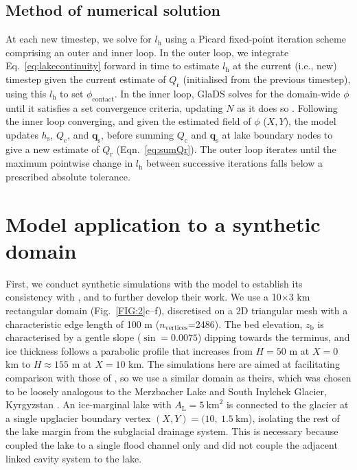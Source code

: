 \documentclass[tc, manuscript]{copernicus}
\begin{document}
\subsection{Method of numerical solution}\label{methods:Numeric}

At each new timestep, we solve for $l_{\mathrm{h}}$ using a Picard fixed-point iteration scheme comprising an outer and inner loop. In the outer loop, we integrate Eq.~\ref{eq:lakecontinuity} forward in time to estimate $l_{\mathrm{h}}$ at the current (i.e., new) timestep given the current estimate of $Q_{\mathrm{r}}$ (initialised from the previous timestep), using this $l_{\mathrm{h}}$ to set $\phi_{\mathrm{contact}}$. In the inner loop, GlaDS solves for the domain-wide $\phi$ until it satisfies a set convergence criteria, updating $N$ as it does so \citep{werder2013modeling,hill2024improved}. Following the inner loop converging, and given the estimated field of $\phi$ ($X,Y$), the model updates $h_{\mathrm{s}}$, $Q_{\mathrm{c}}$, and $\mathbf{q}_{\mathrm{s}}$, before summing $Q_{\mathrm{c}}$ and $\mathbf{q}_{\mathrm{s}}$ at lake boundary nodes to give a new estimate of $Q_{\mathrm{r}}$ (Eqn.~\ref{eq:sumQr}). The outer loop iterates until the maximum pointwise change in $l_{\mathrm{h}}$ between successive iterations falls below a prescribed absolute tolerance.


\section{Model application to a synthetic domain}\label{application:synth}

First, we conduct synthetic simulations with the model to establish its consistency with \citet{kingslake2013modelling}, and to further develop their work. We use a 10$\times$3 km rectangular domain (Fig.~\ref{FIG:2}c--f), discretised on a 2D triangular mesh with a characteristic edge length of 100 m ($n_{\mathrm{vertices}}$=2486). The bed elevation, $z_{\mathrm{b}}$ is characterised by a gentle slope ($\sin=0.0075$) dipping towards the terminus, and ice thickness follows a parabolic profile that increases from $H=50$ m at $X=0$ km to $H\approx155$ m at $X = 10$ km. The simulations here are aimed at facilitating comparison with those of \citet{kingslake2013modelling}, so we use a similar domain as theirs, which was chosen to be loosely analogous to the Merzbacher Lake and South Inylchek Glacier, Kyrgyzstan \citep{ng2009temporal}. An ice-marginal lake with $A_{\mathrm{L}}=5\ \mathrm{km}^{2}$ is connected to the glacier at a single upglacier boundary vertex $(X, Y) = (10,\ 1.5\ \text{km}$), isolating the rest of the lake margin from the subglacial drainage system. This is necessary because \citet{kingslake2013modelling} coupled the lake to a single flood channel only and did not couple the adjacent linked cavity system to the lake. 
\end{document}
